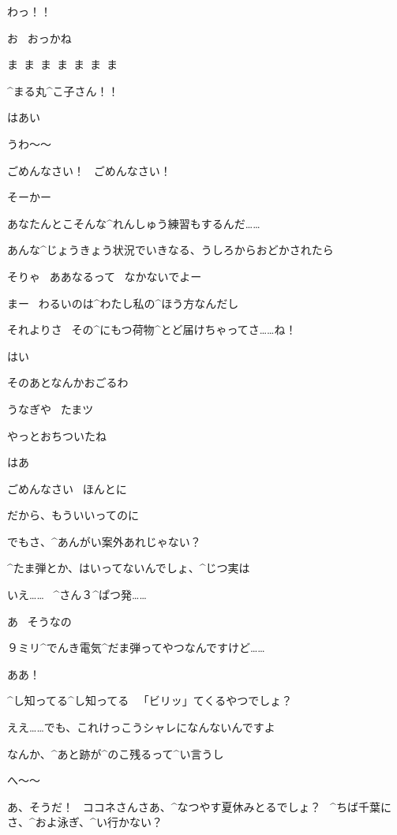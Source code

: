 \page[79]
\Maruko わっ！！

\page[81]
\Maruko お
\ おっかね

\Kokone ま\ ま\ ま\ ま\ ま\ ま\ ま

\Kokone ^{まる}{丸}^{こ}{子}さん！！

\Maruko はあい

\page[82]
\Kokone うわ〜〜

\Kokone ごめんなさい！
\ ごめんなさい！

\Maruko そーかー

\Maruko あなたんとこそんな^{れんしゅう}{練習}もするんだ……

\page[83]
\Maruko あんな^{じょうきょう}{状況}でいきなる、うしろからおどかされたら

\Maruko そりゃ
\ ああなるって
\ なかないでよー

\Maruko まー
\ わるいのは^{わたし}{私}の^{ほう}{方}なんだし

\Maruko それよりさ
\ その^{にもつ}{荷物}^{とど}{届}けちゃってさ……ね！

\Kokone はい

\Maruko そのあとなんかおごるわ

\page[84]
\Sign うなぎや
\ たまツ

\page[85]
\Maruko やっとおちついたね

\Kokone はあ

\Kokone ごめんなさい
\ ほんとに

\Maruko だから、もういいってのに

\page[86]
\Maruko でもさ、^{あんがい}{案外}あれじゃない？

\Maruko ^{たま}{弾}とか、はいってないんでしょ、^{じつ}{実}は

\Kokone いえ……
\ ^{さん}{３}^{ぱつ}{発}……

\Maruko あ
\ そうなの

\Kokone ９ミリ^{でんき}{電気}^{だま}{弾}ってやつなんですけど……

\Maruko ああ！

\Maruko ^{し}{知}ってる^{し}{知}ってる
\ 「ビリッ」てくるやつでしょ？

\Kokone ええ……でも、これけっこうシャレになんないんですよ

\Kokone なんか、^{あと}{跡}が^{のこ}{残}るって^{い}{言}うし

\Maruko へ〜〜

\page[87]
\Maruko あ、そうだ！
\ ココネさんさあ、^{なつやす}{夏休}みとるでしょ？
\ ^{ちば}{千葉}にさ、^{およ}{泳}ぎ、^{い}{行}かない？

